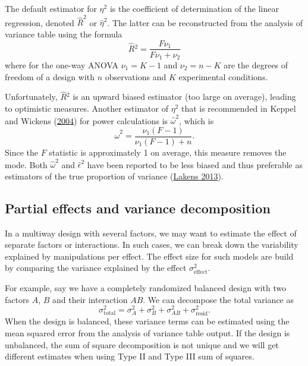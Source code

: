 \documentclass[
  11pt,
  letterpaper,
]{scrbook}
\theoremstyle{definition}
\theoremstyle{remark}
\begin{document}
The default estimator for \(\eta^2\) is the coefficient of determination
of the linear regression, denoted \(\widehat{R}^2\) or
\(\widehat{\eta}^2\). The latter can be reconstructed from the analysis
of variance table using the formula \[
\widehat{R}{}^2 = \frac{F\nu_1}{F\nu_1 + \nu_2}
\] where for the one-way ANOVA \(\nu_1 = K-1\) and \(\nu_2 = n-K\) are
the degrees of freedom of a design with \(n\) observations and \(K\)
experimental conditions.

Unfortunately, \(\widehat{R}{}^2\) is an upward biased estimator (too
large on average), leading to optimistic measures. Another estimator of
\(\eta^2\) that is recommended in Keppel and Wickens
(\protect\hyperlink{ref-Keppelux2fWickens:2004}{2004}) for power
calculations is \(\widehat{\omega}^2\), which is
\[\widehat{\omega}^2 = \frac{\nu_1 (F-1)}{\nu_1(F-1)+n}.\] Since the
\(F\) statistic is approximately 1 on average, this measure removes the
mode. Both \(\widehat{\omega}^2\) and \(\widehat{\epsilon}^2\) have been
reported to be less biased and thus preferable as estimators of the true
proportion of variance (\protect\hyperlink{ref-Lakens:2013}{Lakens
2013}).

\hypertarget{partial-effects-and-variance-decomposition}{%
\subsection{Partial effects and variance
decomposition}\label{partial-effects-and-variance-decomposition}}

In a multiway design with several factors, we may want to estimate the
effect of separate factors or interactions. In such cases, we can break
down the variability explained by manipulations per effect. The effect
size for such models are build by comparing the variance explained by
the effect \(\sigma^2_{\text{effect}}\).

For example, say we have a completely randomized balanced design with
two factors \(A\), \(B\) and their interaction \(AB\). We can decompose
the total variance as
\[\sigma^2_{\text{total}} = \sigma^2_A + \sigma^2_B + \sigma^2_{AB} + \sigma^2_{\text{resid}}.\]
When the design is balanced, these variance terms can be estimated using
the mean squared error from the analysis of variance table output. If
the design is unbalanced, the sum of square decomposition is not unique
and we will get different estimates when using Type II and Type III sum
of squares.
\end{document}
